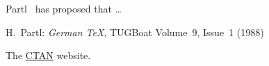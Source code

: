 \documentclass{article}
\begin{document}
Partl~\cite{pa} has proposed that \ldots
\begin{thebibliography}{99}
 H.~Partl:
\emph{German \TeX},
TUGBoat Volume~9, Issue~1 (1988)
\end{thebibliography}
The \href{http://www.ctan.org}{CTAN} website.
\end{document}
